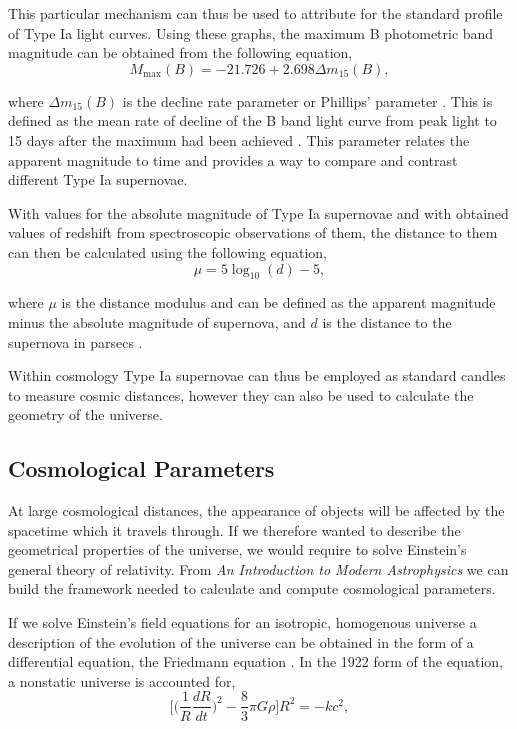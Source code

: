 \documentclass[twocolumn]{revtex4}
\begin{document}
This particular mechanism can thus be used to attribute for the standard profile of Type Ia light curves. Using these graphs, the maximum B photometric band magnitude can be obtained from the following equation,
\begin{equation}
M_{\max}(B)=-21.726+2.698\Delta m_{15}(B),
\end{equation}

where $\Delta m_{15}(B)$ is the decline rate parameter or Phillips' parameter \cite{high_en_astro}. This is defined as the mean rate of decline of the B band light curve from peak light to 15 days after the maximum had been achieved \cite{abs_phil}. This parameter relates the apparent magnitude to time and provides a way to compare and contrast different Type Ia supernovae. 

With values for the absolute magnitude of Type Ia supernovae and with obtained values of redshift from spectroscopic observations of them, the distance to them can then be calculated using the following equation, 
\begin{equation}
\mu = 5 \log_{10}(d) - 5,
\end{equation}

where $\mu$ is the distance modulus and can be defined as the apparent magnitude minus the absolute magnitude of supernova, and $d$ is the distance to the supernova in parsecs \cite{mod_ast}. 

Within cosmology Type Ia supernovae can thus be employed as standard candles to measure cosmic distances, however they can also be used to calculate the geometry of the universe.

\vspace{-3ex}
\subsection{Cosmological Parameters}
\vspace{-2ex}
At large cosmological distances, the appearance of objects will be affected by the spacetime which it travels through. If we therefore wanted to describe the geometrical properties of the universe, we would require to solve Einstein's general theory of relativity. From \textit{An Introduction to Modern Astrophysics} \cite{mod_ast} we can build the framework needed to calculate and compute cosmological parameters. 

If we solve Einstein's field equations for an isotropic, homogenous universe a description of the evolution of the universe can be obtained in the form of a differential equation, the Friedmann equation \cite{mod_ast}. In the 1922 form of the equation, a nonstatic universe is accounted for,
\begin{equation}
\Big[ \Big( \frac{1}{R} \frac{dR}{dt} \Big)^2 - \frac{8}{3} \pi G \rho \Big] R^2 = -k c^2,
\end{equation}
\end{document}
